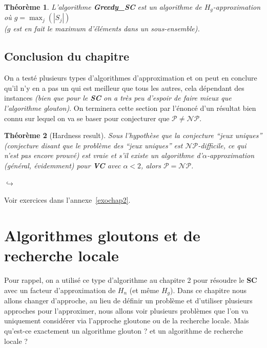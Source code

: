 \documentclass[12pt]{article}
\newcommand{\titre}[1]{\textcolor{title}{#1}}
\newtheorem{thm}{Th\'eor\`eme}[section]
\begin{document}
\begin{thm} L'algorithme \textbf{Greedy\_SC} est un algorithme de
$H_g$-approximation où $g = \max_{j}(|S_j|)$\\ ($g$ est en fait le maximum
d'éléments dans un sous-ensemble).
\end{thm}

\subsection{Conclusion du chapitre}

On a testé plusieurs types d'algorithmes d'approximation et on peut en conclure
qu'il n'y en a pas un qui est meilleur que tous les autres, cela dépendant des
instances \textit{(bien que pour le \titre{\textbf{SC}} on a très peu d'espoir
de faire mieux que l'algorithme glouton)}. On terminera cette section par
l'énoncé d'un résultat bien connu sur lequel on va se baser pour conjecturer
que $\mathcal{P} \neq \mathcal{NP}$.

\begin{thm}[Hardness result]
Sous l'hypothèse que la conjecture ``jeux uniques'' (conjecture disant que le
problème des ``jeux uniques'' est $\mathcal{NP}$-difficile, ce qui n'est pas
encore prouvé) est vraie et s'il existe un algorithme
d'$\alpha$-approximation (général, évidemment) pour \textbf{\titre{VC}} avec
$\alpha < 2$, alors $\mathcal{P} = \mathcal{NP}$.
\end{thm}

\begin{flushright}
$\hookrightarrow$
\begin{large}Voir exercices dans l'annexe~\ref{exochap2}.\end{large}
\end{flushright}



\section{Algorithmes gloutons et de recherche locale}

Pour rappel, on a utilisé ce type d'algorithme au chapitre 2 pour résoudre le
\textbf{\titre{SC}} avec un facteur d'approximation de $H_n$ (et même $H_g$).
Dans ce chapitre nous allons changer d'approche, au lieu de définir un problème
et d'utiliser plusieurs approches pour l'approximer, nous allons voir plusieurs
problèmes que l'on va uniquement considérer via l'approche gloutone ou de la
recherche locale. Mais qu'est-ce exactement un algorithme glouton ? et un
algorithme de recherche locale ?
\end{document}
